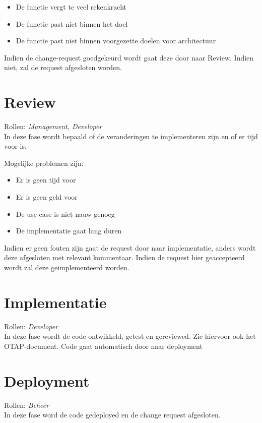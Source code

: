 \documentclass[]{scrreprt}
\begin{document}
	\begin{itemize}
		\item De functie vergt te veel rekenkracht
		\item De functie past niet binnen het doel
		\item De functie past niet binnen voorgezette doelen voor architectuur
	\end{itemize}

	Indien de change-request goedgekeurd wordt gaat deze door naar Review. Indien niet, zal de request afgesloten worden.

	\section{Review}
	
	Rollen: \textit{Management, Developer} \\
	
	In deze fase wordt bepaald of de veranderingen te implementeren zijn en of er tijd voor is.
	
	Mogelijke problemen zijn:
	
	\begin{itemize}
		\item Er is geen tijd voor
		\item Er is geen geld voor
		\item De use-case is niet nauw genoeg
		\item De implementatie gaat lang duren
	\end{itemize}
	
	Indien er geen fouten zijn gaat de request door naar implementatie, anders wordt deze afgesloten met relevant kommentaar. Indien de request hier geaccepteerd wordt zal deze geimplementeerd worden.
	
	\section{Implementatie}
	
	Rollen: \textit{Developer} \\
	
	In deze fase wordt de code ontwikkeld, getest en gereviewed. Zie hiervoor ook het OTAP-document. Code gaat automatisch door naar deployment
	
	\section{Deployment}
	
	Rollen: \textit{Beheer} \\
	
	In deze fase word de code gedeployed en de change request afgesloten.
\end{document}
